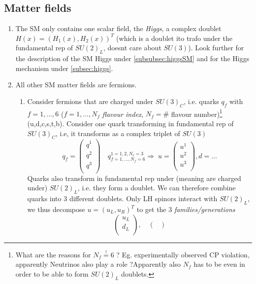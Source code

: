 \subsection{Matter fields}
\begin{enumerate}
\item The SM only contains one scalar field, the \emph{Higgs}, a complex doublet $H(x)=(H_1(x),H_2(x))^T$ (which is a doublet ito trafo under the fundamental rep of $SU(2)_L$, doesnt care about $SU(3)$). Look further for the description of the SM Higgs under \ref{subsubsec:higgsSM} and for the Higgs mechanism under \ref{subsec:higgs}.
\item All other SM matter fields are fermions.
\begin{enumerate}
	\item Consider fermions that are charged under $SU(3)_C$, i.e. quarks $q_f$ with $f=1,\dots,6$ ($f=1,\dots,N_f$ \emph{flavour index}, $N_f=\#$ flavour number)\footnote{What are the reasons for $N_f\stackrel{!}{=}6$ ? Eg. experimentally observed CP violation, apparently Neutrinos also play a role ?Apparently also $N_f$ has to be even in order to be able to form $SU(2)_L$ doublets.} (u,d,c,s,t,b). Consider one quark transforming in fundamental rep of $SU(3)_C$, i.e, it transforms as a complex triplet of $SU(3)$
	\begin{equation*}
		q_f= \begin{pmatrix}
			q^1 \\
			q^2 \\
			q^3 \\
		\end{pmatrix}
	\quad q^{1=1,2,N_c=3}_{f=1,\dots,N_f=6} \Rightarrow \; u=\begin{pmatrix}
		u^1 \\
		u^2\\
		u^3\\
	\end{pmatrix}, d=\dots
	\end{equation*}
Quarks also transform in fundamental rep under (meaning are charged under) $SU(2)_L$, i.e. they form a doublet. We can therefore combine quarks into $3$ different doublets. Only LH spinors interact with $SU(2)_L$, we thus decompose $u=(u_L,u_R)^T$ to get the $3$ \emph{families/generations}
\begin{equation*}
	\begin{pmatrix}
		u_L \\
		d_L\\
	\end{pmatrix},\quad 
\begin{pmatrix}

\end{pmatrix}
\end{equation*}
\end{enumerate}
\end{enumerate}
